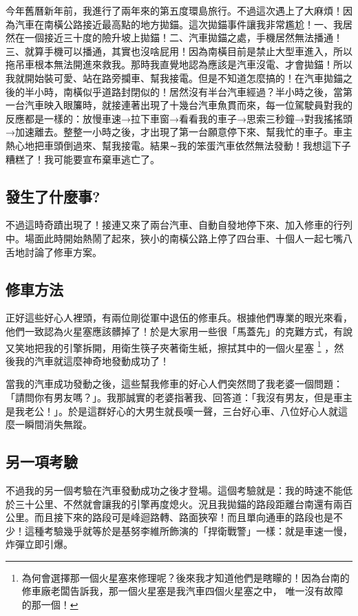 今年舊曆新年前，我進行了兩年來的第五度環島旅行。不過這次遇上了大麻煩！因為汽車在南橫公路接近最高點的地方拋錨。這次拋錨事件讓我非常尷尬！一、我居然在一個接近三十度的險升坡上拋錨！二、汽車拋錨之處，手機居然無法播通！三、就算手機可以播通，其實也沒啥屁用！因為南橫目前是禁止大型車進入，所以拖吊車根本無法開進來救我。那時我直覺地認為應該是汽車沒電、才會拋錨！所以我就開始裝可愛、站在路旁攔車、幫我接電。但是不知道怎麼搞的！在汽車拋錨之後的半小時，南橫似乎道路封閉似的！居然沒有半台汽車經過？半小時之後，當第一台汽車映入眼簾時，就接連著出現了十幾台汽車魚貫而來，每一位駕駛員對我的反應都是一樣的：放慢車速→拉下車窗→看看我的車子→思索三秒鐘→對我搖搖頭→加速離去。整整一小時之後，才出現了第一台願意停下來、幫我忙的車子。車主熱心地把車頭倒過來、幫我接電。結果∼我的笨蛋汽車依然無法發動！我想這下子糟糕了！我可能要宣布棄車逃亡了。

\subsection{發生了什麼事?}
不過這時奇蹟出現了！接連又來了兩台汽車、自動自發地停下來、加入修車的行列中。場面此時開始熱鬧了起來，狹小的南橫公路上停了四台車、十個人一起七嘴八舌地討論了修車方案。

\subsection{修車方法}
正好這些好心人裡頭，有兩位剛從軍中退伍的修車兵。根據他們專業的眼光來看，他們一致認為火星塞應該髒掉了！於是大家用一些很「馬蓋先」的克難方式，有說又笑地把我的引擎拆開，用衛生筷子夾著衛生紙，擦拭其中的一個火星塞%
\footnote{為何會選擇那一個火星塞來修理呢？後來我才知道他們是瞎矇的！因為台南的修車廠老闆告訴我，那一個火星塞是我汽車四個火星塞之中，
唯一沒有故障的那一個！}%
，然後我的汽車就這麼神奇地發動成功了！

 當我的汽車成功發動之後，這些幫我修車的好心人們突然問了我老婆一個問題：「請問你有男友嗎？」。我那誠實的老婆指著我、回答道：「我沒有男友，但是車主是我老公！」。於是這群好心的大男生就長嘆一聲，三台好心車、八位好心人就這麼一瞬間消失無蹤。
 
\subsection{另一項考驗}
不過我的另一個考驗在汽車發動成功之後才登場。這個考驗就是：我的時速不能低於三十公里、不然就會讓我的引擎再度熄火。況且我拋錨的路段距離台南還有兩百公里。而且接下來的路段可是峰迴路轉、路面狹窄！而且單向通車的路段也是不少！這種考驗幾乎就等於是基努李維所飾演的「捍衛戰警」一樣：就是車速一慢，炸彈立即引爆。
 
